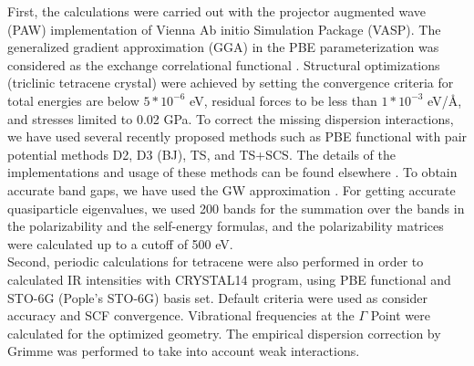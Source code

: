 First, the calculations were carried out with the projector augmented wave (PAW) implementation of Vienna Ab initio Simulation Package (VASP)\cite{kresse1996efficient}. The generalized gradient approximation (GGA) in the PBE parameterization was considered as the exchange correlational functional \cite{perdew1996generalized}. Structural optimizations (triclinic tetracene crystal) were achieved by setting the convergence criteria for total energies are below $5*10^{-6}$ eV, residual forces to be less than $1*10^{-3}$ eV/Å, and stresses limited to 0.02 GPa. To correct the missing dispersion interactions, we have used several recently proposed methods such as PBE functional with pair potential methods D2, D3 (BJ), TS, and TS+SCS. The details of the implementations and usage of these methods can be found elsewhere \cite{grimme2006semiempirical,grimme2011effect,tkatchenko2009accurate,tkatchenko2012accurate,dion2004van}. To obtain accurate band gaps, we have used the GW approximation \cite{bowman2008variational}.  For getting accurate quasiparticle eigenvalues, we used 200 bands for the summation over the bands in the polarizability and the self-energy formulas, and the polarizability matrices were calculated up to a cutoff  of 500 eV.\\ 

Second, periodic calculations for tetracene were also performed in order to calculated IR intensities with CRYSTAL14 program\cite{dovesi2014crystal14}, using PBE functional and STO-6G (Pople's STO-6G) basis set. Default criteria were used as consider accuracy and SCF convergence. Vibrational frequencies at the $\Gamma$ Point were calculated for the optimized geometry. The empirical dispersion correction by Grimme \cite{grimme2006semiempirical} was performed to take into account weak interactions. \\

